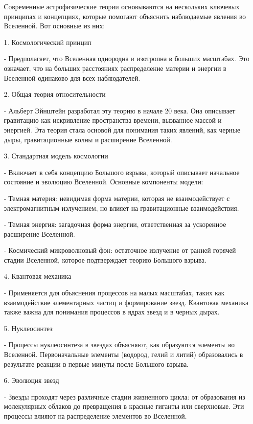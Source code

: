\documentclass[exam_answers.tex]{subfiles}
\begin{document}
\renewcommand{\baselinestretch}{\blch}

Современные астрофизические теории основываются на нескольких ключевых принципах и концепциях, которые помогают объяснить наблюдаемые явления во Вселенной. Вот основные из них:

1. Космологический принцип

   - Предполагает, что Вселенная однородна и изотропна в больших масштабах. Это означает, что на больших расстояниях распределение материи и энергии в Вселенной одинаково для всех наблюдателей.

2. Общая теория относительности

   - Альберт Эйнштейн разработал эту теорию в начале 20 века. Она описывает гравитацию как искривление пространства-времени, вызванное массой и энергией. Эта теория стала основой для понимания таких явлений, как черные дыры, гравитационные волны и расширение Вселенной.

3. Стандартная модель космологии

   - Включает в себя концепцию Большого взрыва, который описывает начальное состояние и эволюцию Вселенной. Основные компоненты модели:
   
     - Темная материя: невидимая форма материи, которая не взаимодействует с электромагнитным излучением, но влияет на гравитационные взаимодействия.
     
     - Темная энергия: загадочная форма энергии, ответственная за ускоренное расширение Вселенной.
     
     - Космический микроволновый фон: остаточное излучение от ранней горячей стадии Вселенной, которое подтверждает теорию Большого взрыва.

4. Квантовая механика

   - Применяется для объяснения процессов на малых масштабах, таких как взаимодействие элементарных частиц и формирование звезд. Квантовая механика также важна для понимания процессов в ядрах звезд и в черных дырах.

5. Нуклеосинтез

   - Процессы нуклеосинтеза в звездах объясняют, как образуются элементы во Вселенной. Первоначальные элементы (водород, гелий и литий) образовались в результате реакции в первые минуты после Большого взрыва.

6. Эволюция звезд

   - Звезды проходят через различные стадии жизненного цикла: от образования из молекулярных облаков до превращения в красные гиганты или сверхновые. Эти процессы влияют на распределение элементов во Вселенной.
\end{document}

